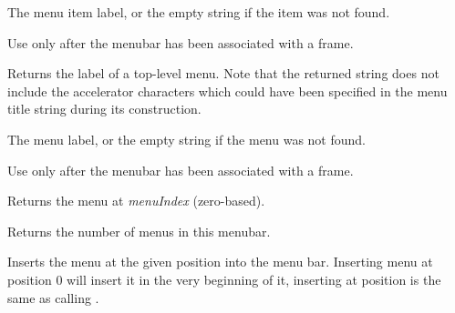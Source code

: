 The menu item label, or the empty string if the item was not found.


Use only after the menubar has been associated with a frame.

\label{wxmenubargetlabeltop}


Returns the label of a top-level menu. Note that the returned string does not
include the accelerator characters which could have been specified in the menu
title string during its construction.




The menu label, or the empty string if the menu was not found.


Use only after the menubar has been associated with a frame.



\label{wxmenubargetmenu}


Returns the menu at {\it menuIndex} (zero-based).

\label{wxmenubargetmenucount}


Returns the number of menus in this menubar.

\label{wxmenubarinsert}


Inserts the menu at the given position into the menu bar. Inserting menu at
position $0$ will insert it in the very beginning of it, inserting at position 
 is the same as calling 
.



